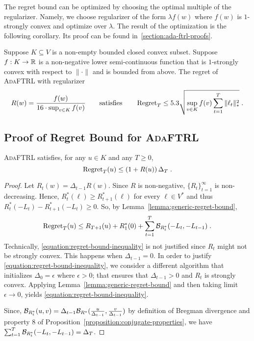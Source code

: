 The regret bound can be optimized by choosing the optimal multiple of the
regularizer.  Namely, we choose regularizer of the form $\lambda f(w)$ where
$f(w)$ is $1$-strongly convex and optimize over $\lambda$. The result of the
optimization is the following corollary.  Its proof can be found
in~\ref{section:ada-ftrl-proofs}.

\begin{corollary}
\label{corollary:ada-ftrl-regret-bound}
Suppose $K \subseteq V$ is a non-empty bounded closed convex subset. Suppose
$f:K \to \mathbb{R}$ is a non-negative lower semi-continuous function that is
$1$-strongly convex with respect to $\|\cdot\|$ and is bounded from above.  The
regret of \textsc{AdaFTRL} with regularizer
$$
R(w) = \frac{f(w)}{16 \cdot \sup_{v \in K} f(v)}
\qquad \text{satisfies} \qquad
\operatorname{Regret}_T \le
5.3 \sqrt{\sup_{v \in K} f(v) \sum_{t=1}^T \|\ell_t\|_*^2} \; .
$$
\end{corollary}

\subsection{Proof of Regret Bound for \textsc{AdaFTRL}}
\label{section:ada-ftrl-regret-bound}

\begin{lemma}
\label{lemma:initial-regret-bound}
\textsc{AdaFTRL} satisfies, for any $u \in K$ and any $T \ge 0$,
$$
\operatorname{Regret}_T(u) \le \left(1 + R(u) \right) \Delta_T \; .
$$
\end{lemma}

\begin{proof}
Let $R_t(w) = \Delta_{t-1} R(w)$. Since $R$ is non-negative,
$\{R_t\}_{t=1}^\infty$ is non-decreasing.  Hence, $R_t^*(\ell) \ge
R_{t+1}^*(\ell)$ for every $\ell \in V^*$ and thus $R_t^*(-L_t) -
R_{t+1}^*(-L_t) \ge 0$.  So, by Lemma~\ref{lemma:generic-regret-bound},
\begin{equation}
\label{equation:regret-bound-inequality}
\operatorname{Regret}_T(u) \le R_{T+1}(u) + R_1^*(0) + \sum_{t=1}^{T} \mathcal{B}_{R_t^*}(-L_t, -L_{t-1}) \; .
\end{equation}
Technically, \eqref{equation:regret-bound-inequality} is not justified since
$R_t$ might not be strongly convex. This happens when $\Delta_{t-1} = 0$. In
order to justify \eqref{equation:regret-bound-inequality}, we consider a
different algorithm that initializes $\Delta_0 = \epsilon$ where $\epsilon >
0$; that ensures that $\Delta_{t-1} > 0$ and $R_t$ is strongly convex.
Applying  Lemma~\ref{lemma:generic-regret-bound} and then taking limit
$\epsilon \to 0$, yields \eqref{equation:regret-bound-inequality}.

Since, $\mathcal{B}_{R_t^*}(u,v) = \Delta_{t-1} \mathcal{B}_{R^*}(\frac{u}{\Delta_{t-1}},
\frac{v}{\Delta_{t-1}})$ by definition of Bregman divergence and property 8 of
Proposition~\ref{proposition:conjugate-properties}, we have $\sum_{t=1}^T
\mathcal{B}_{R_t^*}(-L_t, -L_{t-1}) = \Delta_T$.
\end{proof}

